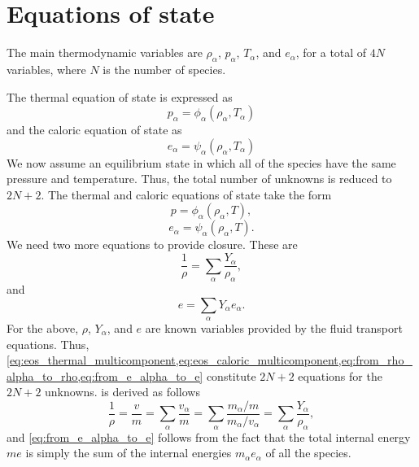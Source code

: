 \documentclass[oneside,a4paper,11pt]{report}
\begin{document}
\section{Equations of state}
The main thermodynamic variables are $\rho_\alpha$, $p_\alpha$, $T_\alpha$, and $e_\alpha$, for a total of $4N$ variables, where $N$ is the number of species.

The thermal equation of state is expressed as
\begin{equation}
    p_\alpha = \phi_\alpha (\rho_\alpha, T_\alpha)
\end{equation}
and the caloric equation of state as
\begin{equation}
    e_\alpha = \psi_\alpha (\rho_\alpha, T_\alpha)
\end{equation}
We now assume an equilibrium state in which all of the species have the same pressure and temperature. Thus, the total number of unknowns is reduced to $2N+2$. The thermal and caloric equations of state take the form
\begin{equation}
\label{eq:eos_thermal_multicomponent}
    p = \phi_\alpha (\rho_\alpha, T),
\end{equation}
\begin{equation}
\label{eq:eos_caloric_multicomponent}
    e_\alpha = \psi_\alpha (\rho_\alpha, T).
\end{equation}
We need two more equations to provide closure. These are
\begin{equation}
\label{eq:from_rho_alpha_to_rho}
   \frac{1}{\rho} = \sum_\alpha \frac{Y_\alpha}{\rho_\alpha},
\end{equation}
and
\begin{equation}
\label{eq:from_e_alpha_to_e}
    e = \sum_\alpha Y_\alpha e_\alpha.
\end{equation}
For the above, $\rho$, $Y_\alpha$, and $e$ are known variables provided by the fluid transport equations. Thus, \cref{eq:eos_thermal_multicomponent,eq:eos_caloric_multicomponent,eq:from_rho_alpha_to_rho,eq:from_e_alpha_to_e} constitute $2N+2$ equations for the $2N+2$ unknowns.  is derived as follows
\begin{equation}
    \frac{1}{\rho} = \frac{v}{m} = \sum_\alpha \frac{v_\alpha}{m} = \sum_\alpha \frac{m_\alpha / m}{m_\alpha / v_\alpha} = \sum_\alpha \frac{Y_\alpha}{\rho_\alpha},
\end{equation}
and \cref{eq:from_e_alpha_to_e} follows from the fact that the total internal energy $m e$ is simply the sum of the internal energies $m_\alpha e_\alpha$ of all the species. 
\end{document}

